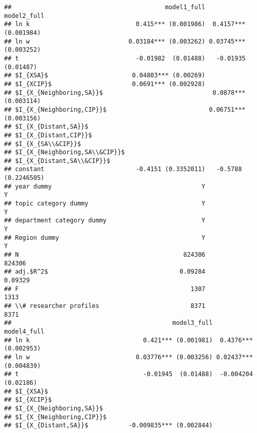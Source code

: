 \documentclass[
]{article}
\begin{document}
\begin{verbatim}
##                                          model1_full           model2_full
## ln k                             0.415*** (0.001986)  0.4157*** (0.001984)
## ln w                           0.03184*** (0.003262) 0.03745*** (0.003252)
## t                                -0.01982  (0.01488)   -0.01935  (0.01487)
## $I_{XSA}$                       0.04803*** (0.00269)                      
## $I_{XCIP}$                      0.0691*** (0.002928)                      
## $I_{X_{Neighboring,SA}}$                              0.0878*** (0.003114)
## $I_{X_{Neighboring,CIP}}$                            0.06751*** (0.003156)
## $I_{X_{Distant,SA}}$                                                      
## $I_{X_{Distant,CIP}}$                                                     
## $I_{X_{SA\\&CIP}}$                                                        
## $I_{X_{Neighboring,SA\\&CIP}}$                                            
## $I_{X_{Distant,SA\\&CIP}}$                                                
## constant                         -0.4151 (0.3352011)   -0.5788 (0.2246505)
## year dummy                                         Y                     Y
## topic category dummy                               Y                     Y
## department category dummy                          Y                     Y
## Region dummy                                       Y                     Y
## N                                             824306                824306
## adj.$R^2$                                    0.09284               0.09329
## F                                               1307                  1313
## \\# researcher profiles                         8371                  8371
##                                            model3_full           model4_full
## ln k                               0.421*** (0.001981)  0.4376*** (0.002953)
## ln w                             0.03776*** (0.003256) 0.02437*** (0.004839)
## t                                  -0.01945  (0.01488)  -0.004204  (0.02186)
## $I_{XSA}$                                                                   
## $I_{XCIP}$                                                                  
## $I_{X_{Neighboring,SA}}$                                                    
## $I_{X_{Neighboring,CIP}}$                                                   
## $I_{X_{Distant,SA}}$           -0.009835*** (0.002844)                      

\end{verbatim}
\end{document}
